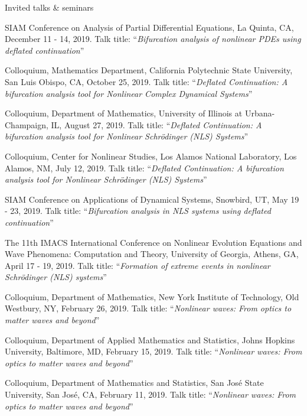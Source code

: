 \documentclass[10pt]{article} %
\begin{document}
\begin{section}{Invited talks \& seminars}
\begin{etaremune}
\item SIAM Conference on Analysis of Partial Differential Equations, La Quinta, CA, December 11 - 14, 2019. 
Talk title: ``\textit{Bifurcation analysis of nonlinear PDEs using deflated continuation}''

\item Colloquium, Mathematics Department, California Polytechnic State University, San Luis Obispo, CA, October 25, 2019. 
Talk title: ``\textit{Deflated Continuation: A bifurcation analysis tool for Nonlinear Complex Dynamical Systems}''  

\item Colloquium, Department of Mathematics, University of Illinois at Urbana-Champaign, IL, August 27, 2019.
      Talk title: ``\textit{Deflated Continuation: A bifurcation analysis tool for Nonlinear Schr\"odinger (NLS) Systems}''

\item Colloquium, Center for Nonlinear Studies, Los Alamos National Laboratory, Los Alamos, NM, July 12, 2019. 
      Talk title: ``\textit{Deflated Continuation: A bifurcation analysis tool for Nonlinear Schr\"odinger (NLS) Systems}''
       
\item SIAM Conference on Applications of Dynamical Systems, Snowbird, UT, May 19 - 23, 2019. Talk title: 
                    ``\textit{Bifurcation analysis in NLS systems using deflated continuation}''

\item The 11th IMACS International Conference on Nonlinear Evolution Equations and Wave Phenomena: Computation and Theory, %
        University of Georgia, Athens, GA, April 17 - 19, 2019. 
        Talk title: ``\textit{Formation of extreme events in nonlinear Schr\"odinger (NLS) systems}''

\item  Colloquium, Department of Mathematics, New York Institute of Technology, Old Westbury, NY, February 26, 2019.
       Talk title: ``\textit{Nonlinear waves: From optics to matter waves and beyond}''          
        
\item   Colloquium, Department of Applied Mathematics and Statistics, Johns Hopkins University, Baltimore, MD, February 15, 2019.
       Talk title: ``\textit{Nonlinear waves: From optics to matter waves and beyond}''        
        
\item   Colloquium, Department of Mathematics and Statistics, San Jos\'e State University, San Jos\'e, CA, February 11, 2019.
       Talk title: ``\textit{Nonlinear waves: From optics to matter waves and beyond}''
        

\end{etaremune}
\end{section}
\end{document}
